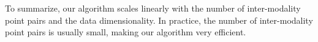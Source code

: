 To summarize, our algorithm scales linearly with the number of inter-modality point pairs and the data dimensionality. In practice, the number of inter-modality point pairs is usually small, making our algorithm very efficient.





